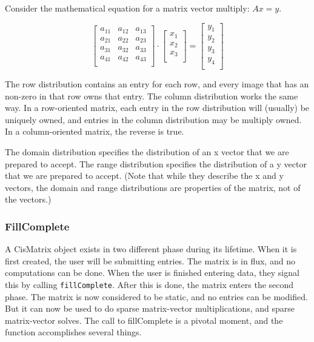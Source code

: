 \documentclass[10pt,relax]{TpetraDesign}
\begin{document}
Consider the mathematical equation for a matrix vector multiply: $Ax = y$.

\begin{equation}
\left[
\begin{array}{cccc}
a_{11} & a_{12} & a_{13}\\
a_{21} & a_{22} & a_{23}\\
a_{31} & a_{32} & a_{33}\\
a_{41} & a_{42} & a_{43}\\
\end{array}
\right]
\cdot
\left[
\begin{array}{c}
x_{1}\\
x_{2}\\
x_{3}\\
\end{array}
\right]
=
\left[
\begin{array}{c}
y_{1}\\
y_{2}\\
y_{3}\\
y_{4}\\
\end{array}
\right]
\end{equation}


The row distribution contains an entry for each row, and every image that has an non-zero in that row owns that entry. The column distribution works the same way. In a row-oriented matrix, each entry in the row distribution will (usually) be uniquely owned, and entries in the column distribution may be multiply owned. In a column-oriented matrix, the reverse is true. 

The domain distribution specifies the distribution of an x vector that we are prepared to accept. The range distribution specifies the distribution of a y vector that we are prepared to accept. (Note that while they describe the x and y vectors, the domain and range distributions are properties of the matrix, not of the vectors.)

\subsubsection*{FillComplete}
A CisMatrix object exists in two different phase during its lifetime. When it is first created, the user will be submitting entries. The matrix is in flux, and no computations can be done. When the user is finished entering data, they signal this by calling \texttt{fillComplete}. After this is done, the matrix enters the second phase. The matrix is now considered to be static, and no entries can be modified. But it can now be used to do sparse matrix-vector multiplications, and sparse matrix-vector solves. The call to fillComplete is a pivotal moment, and the function accomplishes several things.
\end{document}
